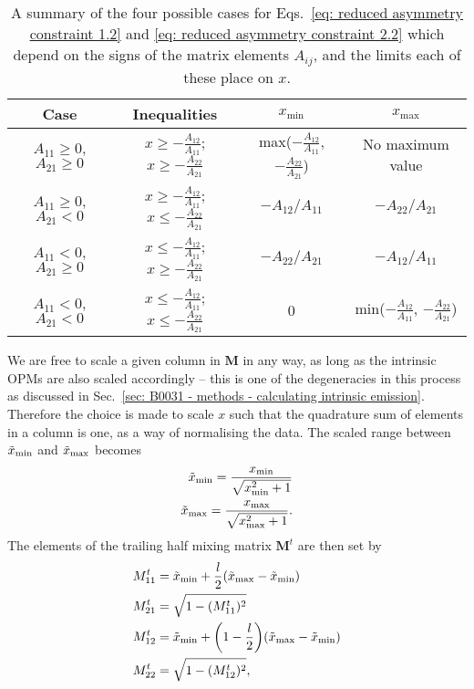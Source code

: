 \begin{table}
    \renewcommand{\arraystretch}{1.5}
    \centering
    \caption[Constraints on the asymmetry matrix used to determine the mixing matrix]{A summary of the four possible cases for Eqs.~\eqref{eq: reduced asymmetry constraint 1.2} and \eqref{eq: reduced asymmetry constraint 2.2} which depend on the signs of the matrix elements $A_{ij}$, and the limits each of these place on $x$.}
    \label{tab: asymmetry constraint cases}
    \begin{tabular}{cccc}
        \hline
        Case 							& Inequalities 									& $x_\mathrm{min}$ 							& $x_\mathrm{max}$ \\
        \hline
        $A_{11}\geq0$, $A_{21}\geq0$	& $x\geq-\frac{A_{12}}{A_{11}}$; $x\geq-\frac{A_{22}}{A_{21}}$	& max($-\frac{A_{12}}{A_{11}}$, $-\frac{A_{22}}{A_{21}}$)    & No maximum value                			\\
        $A_{11}\geq0$, $A_{21}<0$    	& $x\geq-\frac{A_{12}}{A_{11}}$; $x\leq-\frac{A_{22}}{A_{21}}$	& $-A_{12}/A_{11}$	& $-A_{22}/A_{21}$                          \\
        $A_{11}<0$, $A_{21}\geq0$    	& $x\leq-\frac{A_{12}}{A_{11}}$; $x\geq-\frac{A_{22}}{A_{21}}$ 	& $-A_{22}/A_{21}$	& $-A_{12}/A_{11}$                          \\
        $A_{11}<0$, $A_{21}<0$       	& $x\leq-\frac{A_{12}}{A_{11}}$; $x\leq-\frac{A_{22}}{A_{21}}$  & 0	& min($-\frac{A_{12}}{A_{11}}$, $-\frac{A_{22}}{A_{21}}$)
    \end{tabular}
\end{table}
We are free to scale a given column in $\mathbf{M}$ in any way, as long as the intrinsic OPMs are also scaled accordingly -- this is one of the degeneracies in this process as discussed in Sec.~\ref{sec: B0031 - methods - calculating intrinsic emission}. Therefore the choice is made to scale $x$ such that the quadrature sum of elements in a column is one, as a way of normalising the data. The scaled range between $\Tilde{x}_\mathrm{min}$ and $\Tilde{x}_\mathrm{max}$ becomes
\begin{align}
    \Tilde{x}_\mathrm{min} = \frac{x_\mathrm{min}}{\sqrt{x_\mathrm{min}^2 + 1}}\\
    \Tilde{x}_\mathrm{max} = \frac{x_\mathrm{max}}{\sqrt{x_\mathrm{max}^2 + 1}}. 
\end{align}
The elements of the trailing half mixing matrix $\mathbf{M}^t$ are then set by
\begin{align}
    M_{11}^t &= \Tilde{x}_\mathrm{min} + \frac{l}{2}(\Tilde{x}_\mathrm{max} - \Tilde{x}_\mathrm{min})\label{eq: Mt11 level}\\
    M_{21}^t &= \sqrt{1-(M_{11}^t)^2}\label{eq: Mt12 level}\\
    M_{12}^t &= \Tilde{x}_\mathrm{min} + \bigg(1-\frac{l}{2}\bigg)(\Tilde{x}_\mathrm{max} - \Tilde{x}_\mathrm{min})\label{eq: Mt21 level}\\
    M_{22}^t &= \sqrt{1-(M_{12}^t)^2}\label{eq: Mt22 level},
\end{align}
